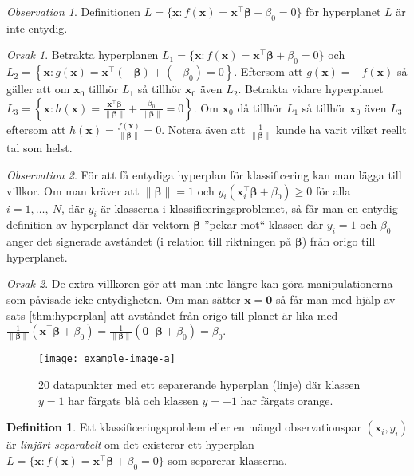 \documentclass[a4paper, 12pt]{report}
\theoremstyle{definition}
\newtheorem{defi}{Definition}[section]
\theoremstyle{remark}
\newtheorem*{rem}{Observation}
\newtheorem*{reas}{Orsak}
\newcommand{\bfbeta}{{\boldsymbol{\beta}}}
\newcommand{\sephyp}{\{ \mathbf{x} : f(\mathbf{x})=\mathbf{x}^\intercal \bfbeta + \beta_0=0\}}
\begin{document}
\begin{rem}
	Definitionen $L=\{ \mathbf{x} : f(\mathbf{x})=\mathbf{x}^\intercal \bfbeta + \beta_0=0\}$ för hyperplanet $L$ är inte entydig.
\end{rem}
\begin{reas}
	Betrakta hyperplanen $L_1 = \sephyp$ och $L_2 = \left\{\mathbf{x}: g(\mathbf{x})=\mathbf{x}^\intercal(-\bfbeta) + (-\beta_0) = 0\right\}$. Eftersom att $g(\mathbf{x}) = -f(\mathbf{x})$ så gäller att om $\mathbf{x}_0$ tillhör $L_1$ så tillhör $\mathbf{x}_0$ även $L_2$.
	Betrakta vidare hyperplanet $L_3= \left\{\mathbf{x}: h(\mathbf{x})=\frac{\mathbf{x}^\intercal\bfbeta}{\|\bfbeta\|} + \frac{\beta_0}{\|\bfbeta\|}=0\right\}$. Om $\mathbf{x}_0$ då tillhör $L_1$ så tillhör $\mathbf{x}_0$ även $L_3$ eftersom att $h(\mathbf{x}) = \frac{f(\mathbf{x})}{\|\bfbeta\|}=0$. Notera även att $\frac{1}{\|\bfbeta\|}$ kunde ha varit vilket reellt tal som helst.
\end{reas}

\begin{rem}
	För att få entydiga hyperplan för klassificering kan man lägga till villkor. Om man kräver att $\|\bfbeta\|=1$ och $y_i(\mathbf{x}_i^\intercal\bfbeta + \beta_0)\geq0$ för alla $i=1,\dots,~N$, där $y_i$ är klasserna i klassificeringsproblemet, så får man en entydig definition av hyperplanet där vektorn $\bfbeta$ ''pekar mot`` klassen där $y_i=1$ och $\beta_0$ anger det signerade avståndet (i relation till riktningen på $\bfbeta$) från origo till hyperplanet.
\end{rem}
\begin{reas}
	De extra villkoren gör att man inte längre kan göra manipulationerna som påvisade icke-entydigheten. Om man sätter $\mathbf{x}=\mathbf{0}$ så får man med hjälp av sats \ref{thm:hyperplan} att avståndet från origo till planet är lika med $\frac{1}{\|\bfbeta\|}(\mathbf{x}^\intercal\bfbeta+\beta_0)=\frac{1}{\|\bfbeta\|}\left(\mathbf{0}^\intercal\bfbeta+\beta_0\right)=\beta_0$.
\end{reas}

\begin{figure}
\centering
\texttt{[image: example-image-a]}
\caption{\label{fig:separatinghyperplane}20 datapunkter med ett separerande hyperplan (linje) där klassen $y=1$ har färgats blå och klassen $y=-1$ har färgats orange.}
\end{figure}

\begin{defi}
	Ett klassificeringsproblem eller en mängd observationspar $\left(\mathbf{x}_i, y_i\right)$ är \textit{linjärt separabelt} om det existerar ett hyperplan $L=\sephyp$ som separerar klasserna.
\end{defi}
\end{document}
